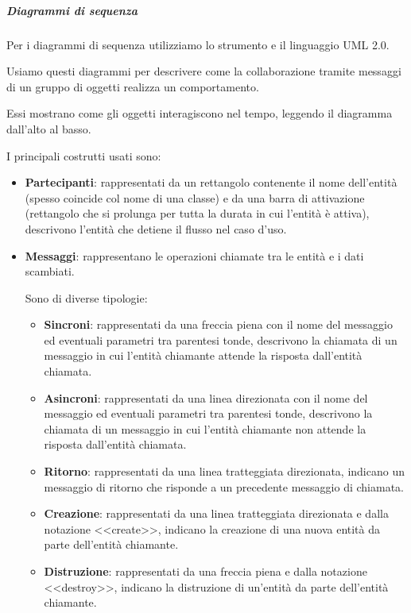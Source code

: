 		\subparagraph{Diagrammi di sequenza}\label{PP:Sviluppo:DiagrammiSequenza}
		Per i diagrammi di sequenza utilizziamo lo strumento  e il linguaggio UML 2.0.\par
        Usiamo questi diagrammi per descrivere come la collaborazione tramite messaggi di un gruppo di oggetti realizza un comportamento.\par
        Essi mostrano come gli oggetti interagiscono nel tempo, leggendo il diagramma dall'alto al basso.\par
        I principali costrutti usati sono:
        \begin{itemize}
            \item \textbf{Partecipanti}: rappresentati da un rettangolo contenente il nome dell'entità (spesso coincide col nome di una classe) e da una barra di attivazione (rettangolo che si prolunga per tutta la durata in cui l'entità è attiva), descrivono l'entità che detiene il flusso nel caso d'uso.
            \item \textbf{Messaggi}: rappresentano le operazioni chiamate tra le entità e i dati scambiati.\par
            Sono di diverse tipologie:
            \begin{itemize}
                \item \textbf{Sincroni}: rappresentati da una freccia piena con il nome del messaggio ed eventuali parametri tra parentesi tonde, descrivono la chiamata di un messaggio in cui l'entità chiamante attende la risposta dall'entità chiamata.
                \item \textbf{Asincroni}: rappresentati da una linea direzionata con il nome del messaggio ed eventuali parametri tra parentesi tonde, descrivono la chiamata di un messaggio in cui l'entità chiamante non attende la risposta dall'entità chiamata.
                \item \textbf{Ritorno}: rappresentati da una linea tratteggiata direzionata, indicano un messaggio di ritorno che risponde a un precedente messaggio di chiamata.
                \item \textbf{Creazione}: rappresentati da una linea tratteggiata direzionata e dalla notazione <<create>>, indicano la creazione di una nuova entità da parte dell'entità chiamante.
                \item \textbf{Distruzione}: rappresentati da una freccia piena e dalla notazione <<destroy>>, indicano la distruzione di un'entità da parte dell'entità chiamante.
            \end{itemize}
        \end{itemize}
